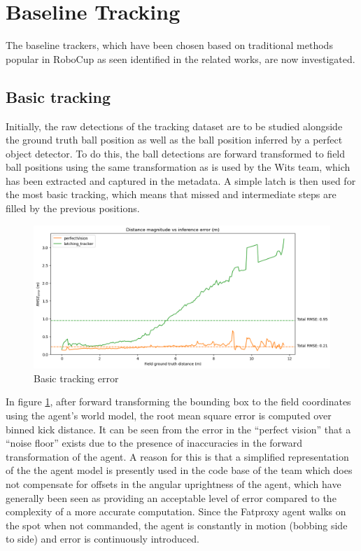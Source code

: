 \documentclass[a4paper,twoside,12pt]{report}
\begin{document}
\section{Baseline Tracking}

The baseline trackers, which have been chosen based on traditional methods popular in RoboCup as seen identified in the related works, are now investigated.

\subsection{Basic tracking}

Initially, the raw detections of the tracking dataset are to be studied alongside the ground truth ball position as well as the ball position inferred by a perfect object detector. To do this, the ball detections are forward transformed to field ball positions using the same transformation as is used by the Wits team, which has been extracted and captured in the metadata. A simple latch is then used for the most basic tracking, which means that missed and intermediate steps are filled by the previous positions.

\begin{figure}[h!]
\begin{center}
\includegraphics[width=14cm]{images/raw_error.png}
\caption{Basic tracking error}
\label{fig:rawerror}
\end{center}
\end{figure}

In figure \ref{fig:rawerror}, after forward transforming the bounding box to the field coordinates using the agent's world model, the root mean square error is computed over binned kick distance. It can be seen from the error in the ``perfect vision'' that a ``noise floor'' exists due to the presence of inaccuracies in the forward transformation of the agent. A reason for this is that a simplified representation of the the agent model is presently used in the code base of the team which does not compensate for offsets in the angular uprightness of the agent, which have generally been seen as providing an acceptable level of error compared to the complexity of a more accurate computation. Since the Fatproxy agent walks on the spot when not commanded, the agent is constantly in motion (bobbing side to side) and error is continuously introduced.
\end{document}

